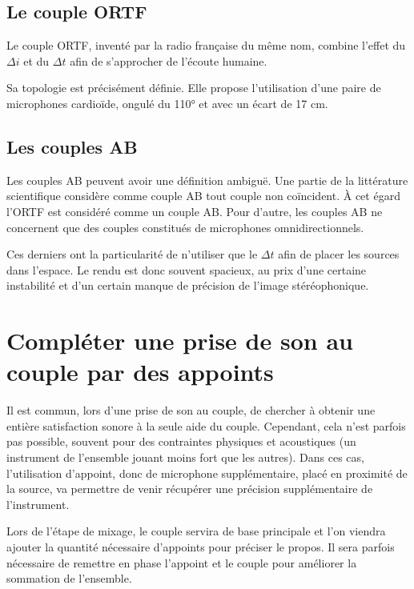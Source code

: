 \documentclass[
]{book}
\begin{document}
\hypertarget{le-couple-ortf}{%
\subsection{Le couple ORTF}\label{le-couple-ortf}}

Le couple ORTF, inventé par la radio française du même nom, combine l'effet du \(\Delta i\) et du \(\Delta t\) afin de s'approcher de l'écoute humaine.

Sa topologie est précisément définie. Elle propose l'utilisation d'une paire de microphones cardioïde, ongulé du 110° et avec un écart de 17 cm.

\hypertarget{les-couples-ab}{%
\subsection{Les couples AB}\label{les-couples-ab}}

Les couples AB peuvent avoir une définition ambiguë. Une partie de la littérature scientifique considère comme couple AB tout couple non coïncident. À cet égard l'ORTF est considéré comme un couple AB. Pour d'autre, les couples AB ne concernent que des couples constitués de microphones omnidirectionnels.

Ces derniers ont la particularité de n'utiliser que le \(\Delta t\) afin de placer les sources dans l'espace. Le rendu est donc souvent spacieux, au prix d'une certaine instabilité et d'un certain manque de précision de l'image stéréophonique.

\hypertarget{compluxe9ter-une-prise-de-son-au-couple-par-des-appoints}{%
\section{Compléter une prise de son au couple par des appoints}\label{compluxe9ter-une-prise-de-son-au-couple-par-des-appoints}}

Il est commun, lors d'une prise de son au couple, de chercher à obtenir une entière satisfaction sonore à la seule aide du couple. Cependant, cela n'est parfois pas possible, souvent pour des contraintes physiques et acoustiques (un instrument de l'ensemble jouant moins fort que les autres). Dans ces cas, l'utilisation d'appoint, donc de microphone supplémentaire, placé en proximité de la source, va permettre de venir récupérer une précision supplémentaire de l'instrument.

Lors de l'étape de mixage, le couple servira de base principale et l'on viendra ajouter la quantité nécessaire d'appoints pour préciser le propos. Il sera parfois nécessaire de remettre en phase l'appoint et le couple pour améliorer la sommation de l'ensemble.
\end{document}
